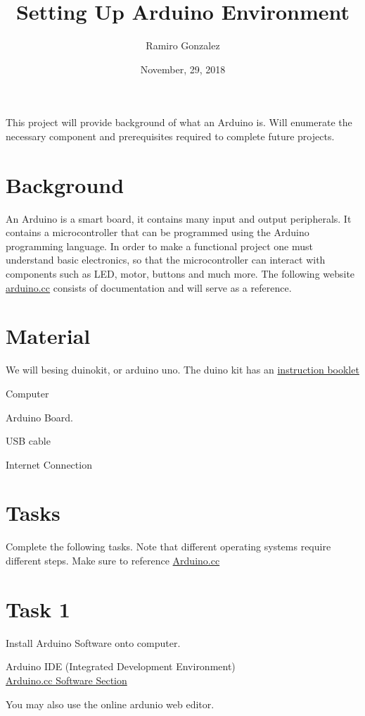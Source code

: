 \documentclass[12pt]{article}
\begin{document}
\title{Setting Up Arduino Environment}
\author{Ramiro Gonzalez}
\date{November, 29, 2018}

\maketitle

\begin{Objective}
	This project will provide background of what an Arduino is. Will enumerate the necessary component and prerequisites required to complete future projects.  
\end{Objective}

\section*{Background}
	An Arduino is a smart board, it contains many input and output peripherals. It contains a microcontroller that can be programmed using the Arduino programming language. In order to make a functional project one must understand basic electronics, so that the microcontroller can interact with components such as LED, motor, buttons and much more. The following website  \color{red} \href{www.arduino.cc}{arduino.cc} \color{black} consists of documentation and will serve as a reference. 
\section*{Material}
We will besing duinokit, or arduino uno. The duino kit has an \color{red} \href{https://drive.google.com/file/d/0B4XGOMubJWWralp1TlBEcnI4NnM/view?usp=sharing}{instruction booklet} \color{black}
\begin{todolist}
    \item Computer 
    \item Arduino Board.
    \item USB cable
    \item Internet Connection
\end{todolist}
\section{Tasks}
Complete the following tasks. Note that different operating systems require different steps. Make sure to reference \href{www.arduino.cc}{Arduino.cc}
\section*{Task 1}
Install Arduino Software onto computer. 
\begin{todolist}
	  \item Arduino IDE (Integrated Development Environment) \\
	  \color{red} 
	  \href{https://www.arduino.cc/en/Main/Software}{Arduino.cc Software Section}\color{black} 
	  \item You may also use the online ardunio web editor. 
\end{todolist}
\end{document}
